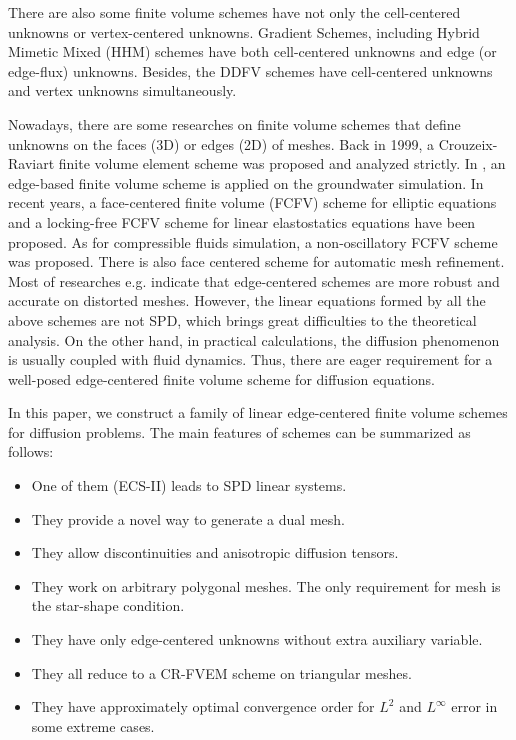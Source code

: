 \documentclass[times,review,preprint]{elsarticle}
\begin{document}
There are also some finite volume schemes have not only the cell-centered unknowns or vertex-centered unknowns. Gradient Schemes, including Hybrid Mimetic Mixed (HHM) schemes \cite{Brezzi2005_1, Brezzi2005_2, Shashkov1995, Morel1998, Droniou2006, Droniou2014, Eymard2010} have both cell-centered unknowns and edge (or edge-flux) unknowns. Besides, the DDFV schemes \cite{Hermeline2000, Andreianov2007, su2018} have cell-centered unknowns and vertex unknowns simultaneously. 

Nowadays, there are some researches on finite volume schemes that define unknowns on the faces (3D) or edges (2D) of meshes. Back in 1999, a Crouzeix-Raviart finite volume element scheme \cite{Chatzipantelidis1999} was proposed and analyzed strictly. In \cite{Rees2004}, an edge-based finite volume scheme is applied on the groundwater simulation. In recent years, a face-centered finite volume (FCFV) scheme for elliptic equations \cite{Sevilla2018, Vieira2020} and a locking-free FCFV scheme for linear elastostatics equations \cite{Sevilla2019} have been proposed. As for compressible fluids simulation, a non-oscillatory FCFV scheme \cite{Vila-Perez2022} was proposed. There is also face centered scheme \cite{Giacomini2020} for automatic mesh refinement. Most of researches e.g. \cite{Vieira2020} indicate that edge-centered schemes are more robust and accurate on distorted meshes. However, the linear equations formed by all the above schemes are not SPD, which brings great difficulties to the theoretical analysis. On the other hand, in practical calculations, the diffusion phenomenon is usually coupled with fluid dynamics. Thus, there are eager requirement for a well-posed edge-centered finite volume scheme for diffusion equations. 

In this paper, we construct a family of linear edge-centered finite volume schemes for diffusion problems. The main features of schemes can be summarized as follows:
\begin{itemize}
\item One of them (ECS-II) leads to SPD linear systems.
\item They provide a novel way to generate a dual mesh.
\item They allow discontinuities and anisotropic diffusion tensors.
\item They work on arbitrary polygonal meshes. The only requirement for mesh is the star-shape condition.
\item They have only edge-centered unknowns without extra auxiliary variable.
\item They all reduce to a CR-FVEM scheme on triangular meshes.
\item They have approximately optimal convergence order for $L^2$ and $L^\infty$ error in some extreme cases.
\end{itemize}
\end{document}
